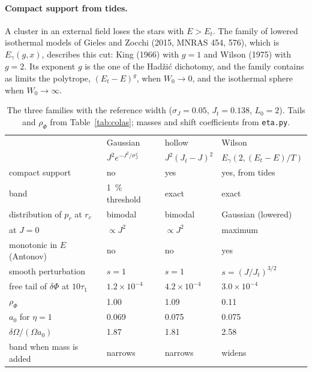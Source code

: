 \documentclass[11pt,a4paper]{article}
\begin{document}
\paragraph{Compact support from tides.} A cluster in an external field loses the stars
with $E>E_t$. The family of lowered isothermal models of Gieles and Zocchi (2015, MNRAS
454, 576), which is $E_\gamma(g,x)$, describes this cut: King (1966) with $g=1$ and Wilson (1975)
with $g=2$. Its exponent $g$ is the one of the Hadžić dichotomy, and the family contains
as limits the polytrope, $(E_t-E)^g$, when $W_0\to0$, and the isothermal sphere when
$W_0\to\infty$.

\begin{table}[!htbp]
\centering
\small
\begin{tabular}{L{4.4cm}L{2.9cm}L{2.9cm}L{2.9cm}}
\toprule
 & Gaussian & hollow & Wilson\\
 & $J^2e^{-J^2/\sigma_J^2}$ & $J^2(J_t-J)^2$ & $E_\gamma(2,(E_t-E)/T)$\\
\midrule
compact support & no & yes & yes, from tides\\
band & \SI{1}{\%} threshold & exact & exact\\
distribution of $p_r$ at $r_c$ & bimodal & bimodal & Gaussian (lowered)\\
at $J=0$ & $\propto J^2$ & $\propto J^2$ & maximum\\
monotonic in $E$ (Antonov) & no & no & yes\\
smooth perturbation & $s=1$ & $s=1$ & $s=(J/J_t)^{3/2}$\\
free tail of $\delta\Phi$ at $10\tau_1$ & $1.2\times10^{-4}$ & $4.2\times10^{-4}$ & $3.0\times10^{-4}$\\
$\rho_\Phi$ & 1.00 & 1.09 & 0.11\\
$a_0$ for $\eta=1$ & 0.069 & 0.075 & 0.075\\
$\delta\Omega/(\Omega a_0)$ & 1.87 & 1.81 & 2.58\\
band when mass is added & narrows & narrows & widens\\
\bottomrule
\end{tabular}
\caption{The three families with the reference width ($\sigma_J=0.05$, $J_t=0.138$, $L_0=2$).
Tails and $\rho_\Phi$ from Table~\ref{tab:colas}; masses and shift coefficients from
\texttt{eta.py}.}
\label{tab:familias}
\end{table}
\end{document}
